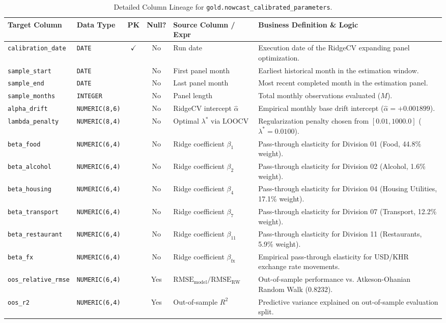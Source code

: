 \documentclass[a4paper, 11pt]{article}
\begin{document}
\begin{table}[H]
\centering
\small
\begin{tabularx}{\textwidth}{l p{2.5cm} c c p{4.2cm} X}
\toprule
\textbf{Target Column} & \textbf{Data Type} & \textbf{PK} & \textbf{Null?} & \textbf{Source Column / Expr} & \textbf{Business Definition \& Logic} \\
\midrule
\texttt{calibration\_date} & \texttt{DATE} & $\checkmark$ & No & Run date & Execution date of the RidgeCV expanding panel optimization. \\
\texttt{sample\_start} & \texttt{DATE} & & No & First panel month & Earliest historical month in the estimation window. \\
\texttt{sample\_end} & \texttt{DATE} & & No & Last panel month & Most recent completed month in the estimation panel. \\
\texttt{sample\_months} & \texttt{INTEGER} & & No & Panel length & Total monthly observations evaluated ($M$). \\
\texttt{alpha\_drift} & \texttt{NUMERIC(8,6)} & & No & RidgeCV intercept $\hat{\alpha}$ & Empirical monthly base drift intercept ($\hat{\alpha} = +0.001899$). \\
\texttt{lambda\_penalty} & \texttt{NUMERIC(8,4)} & & No & Optimal $\lambda^*$ via LOOCV & Regularization penalty chosen from $[0.01, 1000.0]$ ($\lambda^* = 0.0100$). \\
\texttt{beta\_food} & \texttt{NUMERIC(6,4)} & & No & Ridge coefficient $\beta_1$ & Pass-through elasticity for Division 01 (Food, 44.8\% weight). \\
\texttt{beta\_alcohol} & \texttt{NUMERIC(6,4)} & & No & Ridge coefficient $\beta_2$ & Pass-through elasticity for Division 02 (Alcohol, 1.6\% weight). \\
\texttt{beta\_housing} & \texttt{NUMERIC(6,4)} & & No & Ridge coefficient $\beta_4$ & Pass-through elasticity for Division 04 (Housing Utilities, 17.1\% weight). \\
\texttt{beta\_transport} & \texttt{NUMERIC(6,4)} & & No & Ridge coefficient $\beta_7$ & Pass-through elasticity for Division 07 (Transport, 12.2\% weight). \\
\texttt{beta\_restaurant} & \texttt{NUMERIC(6,4)} & & No & Ridge coefficient $\beta_{11}$ & Pass-through elasticity for Division 11 (Restaurants, 5.9\% weight). \\
\texttt{beta\_fx} & \texttt{NUMERIC(6,4)} & & No & Ridge coefficient $\beta_{\text{fx}}$ & Empirical pass-through elasticity for USD/KHR exchange rate movements. \\
\texttt{oos\_relative\_rmse} & \texttt{NUMERIC(6,4)} & & Yes & $\text{RMSE}_{\text{model}} / \text{RMSE}_{\text{RW}}$ & Out-of-sample performance vs. Atkeson-Ohanian Random Walk ($0.8232$). \\
\texttt{oos\_r2} & \texttt{NUMERIC(6,4)} & & Yes & Out-of-sample $R^2$ & Predictive variance explained on out-of-sample evaluation split. \\
\bottomrule
\end{tabularx}
\caption{Detailed Column Lineage for \texttt{gold.nowcast\_calibrated\_parameters}.}
\end{table}
\end{document}
